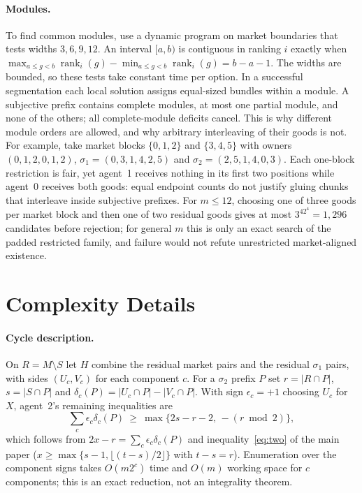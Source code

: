 \documentclass[11pt]{article}
\theoremstyle{definition}
\begin{document}
\paragraph{Modules.}
To find common modules, use a dynamic program on market boundaries that tests widths $3,6,9,12$. An interval $[a,b)$ is contiguous in ranking $i$ exactly when $\max_{a\le g<b}\operatorname{rank}_i(g)-\min_{a\le g<b}\operatorname{rank}_i(g)=b-a-1$. The widths are bounded, so these tests take constant time per option. In a successful segmentation each local solution assigns equal-sized bundles within a module. A subjective prefix contains complete modules, at most one partial module, and none of the others; all complete-module deficits cancel. This is why different module orders are allowed, and why arbitrary interleaving of their goods is not. For example, take market blocks $\{0,1,2\}$ and $\{3,4,5\}$ with owners $(0,1,2,0,1,2)$, $\sigma_1=(0,3,1,4,2,5)$ and $\sigma_2=(2,5,1,4,0,3)$. Each one-block restriction is fair, yet agent~1 receives nothing in its first two positions while agent~0 receives both goods: equal endpoint counts do not justify gluing chunks that interleave inside subjective prefixes.
For $m\le12$, choosing one of three goods per market block and then one of two residual goods gives at most $3^42^4=1{,}296$ candidates before rejection; for general $m$ this is only an exact search of the padded restricted family, and failure would not refute unrestricted market-aligned existence.

\section{Complexity Details}\label{app:complexity}
\paragraph{Cycle description.}
On $R=M\setminus S$ let $H$ combine the residual market pairs and the residual $\sigma_1$ pairs, with sides $(U_c,V_c)$ for each component $c$. For a $\sigma_2$ prefix $P$ set $r=|R\cap P|$, $s=|S\cap P|$ and $\delta_c(P)=|U_c\cap P|-|V_c\cap P|$. With sign $\epsilon_c=+1$ choosing $U_c$ for $X$, agent~2's remaining inequalities are
\[
 \sum_c\epsilon_c\delta_c(P)\ \ge\ \max\{2s-r-2,\,-(r\bmod2)\},
\]
which follows from $2x-r=\sum_c\epsilon_c\delta_c(P)$ and inequality~\eqref{eq:two} of the main paper ($x\ge\max\{s-1,\lfloor(t-s)/2\rfloor\}$ with $t-s=r$). Enumeration over the component signs takes $O(m2^c)$ time and $O(m)$ working space for $c$ components; this is an exact reduction, not an integrality theorem.
\end{document}
